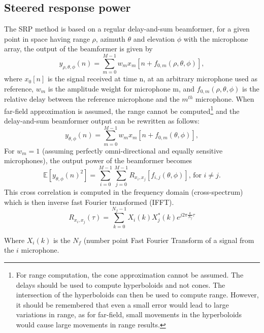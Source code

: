 \subsection{Steered response power}
The SRP method is based on a regular delay-and-sum beamformer, for a given point in space having range $\rho$, azimuth $\theta$ and elevation $\phi$ with the microphone array, the output of the beamformer is given by
\begin{equation}
    y_{\rho,\theta,\phi}(n)=\sum\limits_{m=0}^{M-1}{w_m x_m[n + f_{0,m}(\rho,\theta,\phi)]},
\end{equation}
where $x_0[n]$ is the signal received at time n, at an arbitrary microphone used as reference, $w_m$ is the amplitude weight for microphone m, and $f_{0,m}(\rho,\theta,\phi)$ is the relative delay between the reference microphone and the $m^{th}$ microphone. When far-field approximation is assumed, the range cannot be computed\footnote{For range computation, the cone approximation cannot be assumed. The delays should be used to compute hyperboloids and not cones. The intersection of the hyperboloids can then be used to compute range. However, it should be remembered that even a small error would lead to large variations in range, as for far-field, small movements in the hyperboloids would cause large movements in range results.} and the delay-and-sum beamformer output can be rewritten as follows:
\begin{equation}
    y_{\theta,\phi}(n)=\sum\limits_{m=0}^{M-1}{w_m x_m[n + f_{0,m}(\theta,\phi)]},
\end{equation}
For $w_m=1$ (assuming perfectly omni-directional and equally sensitive microphones), the output power of the beamformer becomes
\begin{equation}
    \mathbb{E}[{y_{\theta,\phi}(n)^2}]=\sum\limits_{i=0}^{M-1}\sum\limits_{j=0}^{M-1}{R_{x_i,x_j}[f_{i,j}(\theta,\phi)]} \text{, for } i\neq j.
    \label{eq:poweroutputbeamformer}
\end{equation}
This cross correlation is computed in the frequency domain (cross-spectrum) which is then inverse fast Fourier transformed (IFFT).
\begin{equation}
    R_{x_i,x_j}(\tau)= \sum\limits_{k=0}^{N_{f}-1}{X_{i}(k)X_{j}^*(k)e^{j2\pi\frac{k}{N_{f}}\tau}}
\end{equation}

Where $X_{i}(k)$ is the $N_{f}$ (number  point Fast Fourier Transform of a signal from the $i$ microphone.  

